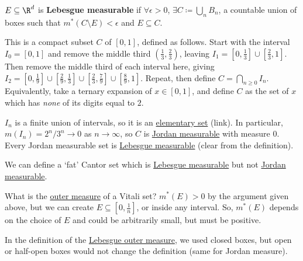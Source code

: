 \documentclass{article}
\newcommand{\1}[1]{\mathbbm{1}_{#1}}
\begin{document}
\begin{defi}
    $E \subseteq \R^d$ is \textbf{Lebesgue measurable} if $\forall \epsilon > 0$, $\exists C \coloneqq \bigcup_{n} B_n$, a countable union of boxes such that $m^*(C \setminus E) < \epsilon$ and $E \subseteq C$.
\end{defi}

\begin{eg} 
    This is a compact subset $C$ of $[0, 1]$, defined as follows.  Start with the interval $I_0 = [0, 1]$ and remove the middle third $\left(\frac13, \frac23\right)$, leaving $I_1 = \left[0, \frac13\right] \cup \left[\frac23, 1\right]$.
    Then remove the middle third of each interval here, giving $I_2 = \left[0, \frac19\right] \cup \left[\frac29, \frac13\right] \cup \left[\frac23, \frac79\right] \cup \left[\frac89, 1\right]$.
    Repeat, then define $C = \bigcap_{n \geq 0} I_n$.
    Equivalently, take a ternary expansion of $x \in [0, 1]$, and define $C$ as the set of $x$ which has \emph{none} of its digits equal to $2$.
\end{eg}

\begin{remark}
    $I_n$ is a finite union of intervals, so it is an \hyperlink{def:elemSubs}{elementary set} (link).
    In particular, $m(I_n) = 2^n / 3^n \to 0$ as $n \to \infty$, so $C$ is \hyperlink{def:jMeasurable}{Jordan measurable} with measure $0$.
    Every Jordan measurable set is \hyperlink{def:lebMAble}{Lebesgue measurable} (clear from the definition).
\end{remark}

We can define a `fat' Cantor set which is \hyperlink{def:lebMAble}{Lebesgue measurable} but not \hyperlink{def:jMeasurable}{Jordan measurable}.

\begin{remark}
    What is the \hyperlink{def:lebOutMeas}{outer measure} of a Vitali set?
    $m^*(E) > 0$ by the argument given above, but we can create $E \subseteq [0, \frac1n]$, or inside any interval. So, $m^*(E)$ depends on the choice of $E$ and could be arbitrarily small, but must be positive.
\end{remark}

\begin{remark}
    In the definition of the \hyperlink{def:lebOutMeas}{Lebesgue outer measure}, we used closed boxes, but open or half-open boxes would not change the definition (same for Jordan measure).
\end{remark}
\end{document}
